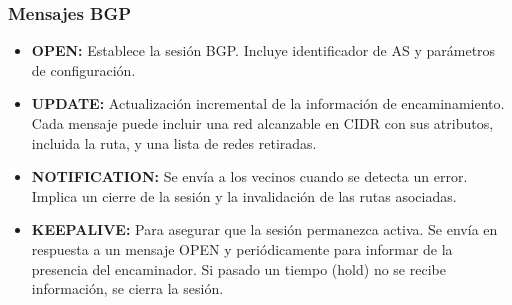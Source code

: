 \subsubsection{Mensajes BGP}
\begin{itemize}
    \item \textbf{OPEN: }Establece la sesión BGP. Incluye identificador de AS y parámetros de configuración.
    \item \textbf{UPDATE: }Actualización incremental de la información de encaminamiento. Cada mensaje puede incluir una red alcanzable en CIDR con sus atributos, incluida la ruta, y una lista de redes retiradas.
    \item \textbf{NOTIFICATION: }Se envía a los vecinos cuando se detecta un error. Implica un cierre de la sesión y la invalidación de las rutas asociadas.
    \item \textbf{KEEPALIVE: }Para asegurar que la sesión permanezca activa. Se envía en respuesta a un mensaje OPEN y periódicamente para informar de la
    presencia del encaminador. Si pasado un tiempo (hold) no se recibe información, se cierra la sesión.
\end{itemize}
